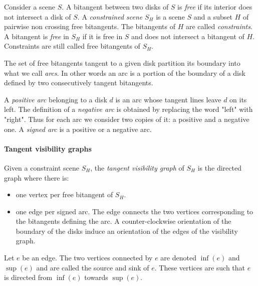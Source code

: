 Consider a scene $S$. A bitangent between two disks of $S$ is \emph{free}
if its interior does not intersect a disk of $S$.  A \emph{constrained
scene} $S_H$ is a scene $S$ and a subset $H$ of pairwise non crossing free
bitangents. The bitangents of $H$ are called \emph{constraints}. A
bitangent is \emph{free} in $S_H$ if it is free in $S$ and does not
intersect a bitangent of $H$.  Constraints are still called free bitangents
of $S_H$.

The set of free bitangents tangent to a given disk partition its boundary
into what we call \emph{arcs}. In other words an arc is a portion of the
boundary of a disk defined by two consecutively tangent bitangents.

A \emph{positive arc} belonging to a disk $d$ is an arc whose tangent lines
leave $d$ on its left. The definition of a \emph{negative arc} is obtained
by replacing the word "left" with "right". Thus for each arc we consider
two copies of it: a positive and a negative one. A \emph{signed arc} is a
positive or a negative arc.

\paragraph{Tangent visibility graphs}
Given a constraint scene $S_H$, the \emph{tangent visibility graph} of
$S_H$ is the directed graph where there is:
\begin{itemize}
    \item one vertex per free bitangent of $S_H$.
    \item one edge per signed arc. The edge connects the two vertices
    corresponding to the bitangents defining the arc. A counter-clockwise
    orientation of the boundary of the disks induce an orientation of the
    edges of the visibility graph.
\end{itemize}
Let $e$ be an edge. The two vertices connected by $e$ are denoted $\inf(e)$ and
$\sup(e)$ and are called the source and sink of $e$. These vertices are such
that $e$ is directed from $\inf(e)$ towards $\sup(e)$.

